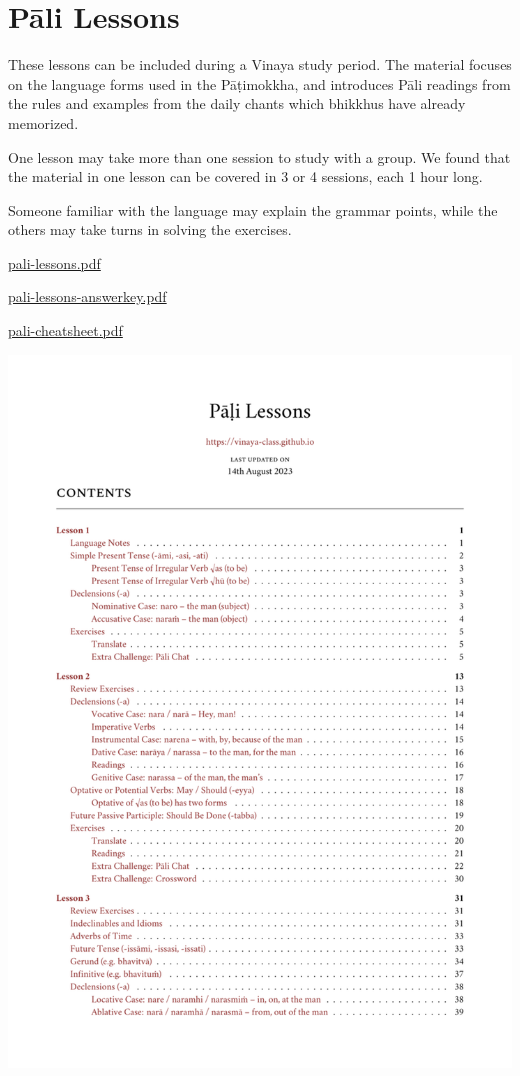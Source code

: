 \chapter{Pāli Lessons}

These lessons can be included during a Vinaya study period. The material
focuses on the language forms used in the Pāṭimokkha, and introduces
Pāli readings from the rules and examples from the daily chants which
bhikkhus have already memorized.

One lesson may take more than one session to study with a group. We
found that the material in one lesson can be covered in 3 or 4 sessions,
each 1 hour long.

Someone familiar with the language may explain the grammar points, while
the others may take turns in solving the exercises.

\href{./includes/docs/pali-lessons.pdf}{pali-lessons.pdf}

\href{./includes/docs/pali-lessons-answerkey.pdf}{pali-lessons-answerkey.pdf}

\href{./includes/docs/pali-cheatsheet.pdf}{pali-cheatsheet.pdf}

\href{./includes/docs/pali-lessons.pdf}{\includegraphics{./includes/docs/pali-lessons-thumb.png}}

